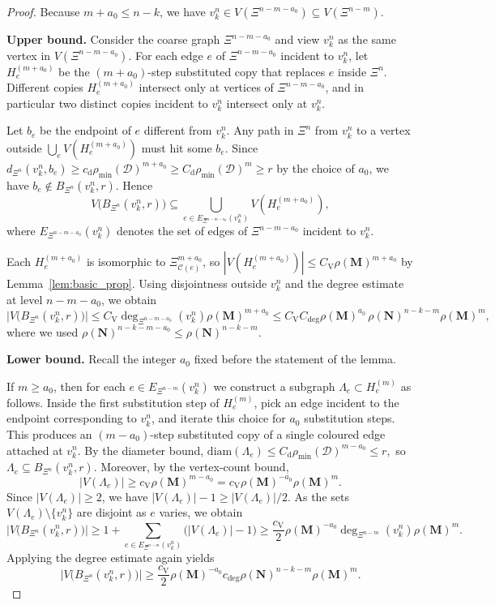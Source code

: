 \documentclass{article}
\theoremstyle{plain}
\theoremstyle{definition}
\newcommand{\dist}{\mathrm{d}}
\newcommand{\diam}{\mathrm{diam}}
\begin{document}
\begin{proof}
Because $m+a_0\le n-k$, we have $v_k^n\in V(\Xi^{n-m-a_0})\subseteq V(\Xi^{n-m})$.

\textbf{Upper bound.}
Consider the coarse graph $\Xi^{n-m-a_0}$ and view $v_k^n$ as the same vertex in $V(\Xi^{n-m-a_0})$.
For each edge $e$ of $\Xi^{n-m-a_0}$ incident to $v_k^n$, let $H_e^{(m+a_0)}$ be the $(m+a_0)$-step substituted copy that replaces $e$ inside $\Xi^n$.
Different copies $H_e^{(m+a_0)}$ intersect only at vertices of $\Xi^{n-m-a_0}$, and in particular two distinct copies incident to $v_k^n$ intersect only at $v_k^n$.

Let $b_e$ be the endpoint of $e$ different from $v_k^n$.
Any path in $\Xi^n$ from $v_k^n$ to a vertex outside $\bigcup_{e}V(H_e^{(m+a_0)})$ must hit some $b_e$.
Since
$
d_{\Xi^n}(v_k^n,b_e)\ge c_{\dist}\rho_{\min}(\mathcal D)^{m+a_0}\ge C_{\dist}\rho_{\min}(\mathcal D)^{m}\ge r
$
by the choice of $a_0$, we have $b_e\notin B_{\Xi^n}(v_k^n,r)$.
Hence
\[
V\big(B_{\Xi^n}(v_k^n,r)\big)
\subseteq
\bigcup_{e\in E_{\Xi^{n-m-a_0}}(v_k^n)} V(H_e^{(m+a_0)}),
\]
where $E_{\Xi^{n-m-a_0}}(v_k^n)$ denotes the set of edges of $\Xi^{n-m-a_0}$ incident to $v_k^n$.

Each $H_e^{(m+a_0)}$ is isomorphic to $\Xi_{\mathscr C(e)}^{m+a_0}$, so $|V(H_e^{(m+a_0)})|\le C_{\mathrm V}\rho(\mathbf M)^{m+a_0}$ by Lemma~\ref{lem:basic_prop}.
Using disjointness outside $v_k^n$ and the degree estimate at level $n-m-a_0$, we obtain
\[
\big|V\big(B_{\Xi^n}(v_k^n,r)\big)\big|
\le
C_{\mathrm V}\deg_{\Xi^{n-m-a_0}}(v_k^n)\rho(\mathbf M)^{m+a_0}
\le
C_{\mathrm V}C_{\deg}\rho(\mathbf M)^{a_0}\,\rho(\mathbf N)^{n-k-m}\rho(\mathbf M)^m,
\]
where we used $\rho(\mathbf N)^{n-k-m-a_0}\le\rho(\mathbf N)^{n-k-m}$.

\textbf{Lower bound.}
Recall the integer $a_0$ fixed before the statement of the lemma.

If $m\ge a_0$, then for each $e\in E_{\Xi^{n-m}}(v_k^n)$ we construct a subgraph $\Lambda_e\subset H_e^{(m)}$ as follows.
Inside the first substitution step of $H_e^{(m)}$, pick an edge incident to the endpoint corresponding to $v_k^n$, and iterate this choice for $a_0$ substitution steps.
This produces an $(m-a_0)$-step substituted copy of a single coloured edge attached at $v_k^n$.
By the diameter bound,
$
\diam(\Lambda_e)\le C_{\dist}\rho_{\min}(\mathcal D)^{m-a_0}\le r,
$
so $\Lambda_e\subseteq B_{\Xi^n}(v_k^n,r)$.
Moreover, by the vertex-count bound,
\[
|V(\Lambda_e)|\ge c_{\mathrm V}\rho(\mathbf M)^{m-a_0}=c_{\mathrm V}\rho(\mathbf M)^{-a_0}\rho(\mathbf M)^m.
\]
Since $|V(\Lambda_e)|\ge 2$, we have $|V(\Lambda_e)|-1\ge |V(\Lambda_e)|/2$.
As the sets $V(\Lambda_e)\setminus\{v_k^n\}$ are disjoint as $e$ varies, we obtain
\[
\big|V\big(B_{\Xi^n}(v_k^n,r)\big)\big|
\ge
1+\sum_{e\in E_{\Xi^{n-m}}(v_k^n)} \bigl(|V(\Lambda_e)|-1\bigr)
\ge
\frac{c_{\mathrm V}}{2}\rho(\mathbf M)^{-a_0}\deg_{\Xi^{n-m}}(v_k^n)\rho(\mathbf M)^m.
\]
Applying the degree estimate again yields
\[
\big|V\big(B_{\Xi^n}(v_k^n,r)\big)\big|
\ge
\frac{c_{\mathrm V}}{2}\rho(\mathbf M)^{-a_0}c_{\deg}\rho(\mathbf N)^{n-k-m}\rho(\mathbf M)^m.
\]


\end{proof}
\end{document}
